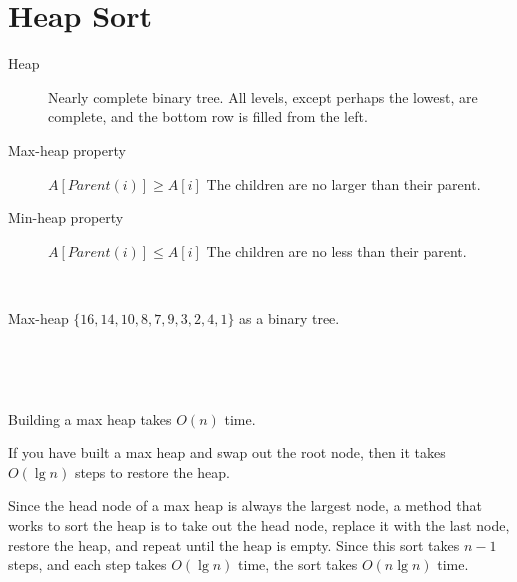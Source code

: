 \section{Heap Sort}

\begin{description}
	\item [Heap] Nearly complete binary tree.  All levels, except perhaps the lowest, are complete, and the bottom row is filled from the left.  
	\item [Max-heap property] $A[Parent(i)] \ge A[i]$ The children are no larger than their parent.  
	\item [Min-heap property] $A[Parent(i)] \le A[i]$ The children are no less than their parent.  
\end{description}

\

Max-heap $\{16,14,10,8,7,9,3,2,4,1\}$ as a binary tree.  

\


\

Building a max heap takes $O(n)$ time.  

If you have built a max heap and swap out the root node, then it takes $O(\lg n)$ steps to restore the heap.  

Since the head node of a max heap is always the largest node, a method that works to sort the heap is to take out the head node, replace it with the last node, restore the heap, and repeat until the heap is empty.  Since this sort takes $n-1$ steps, and each step takes $O(\lg n)$ time, the sort takes $O(n \lg n)$ time.  

